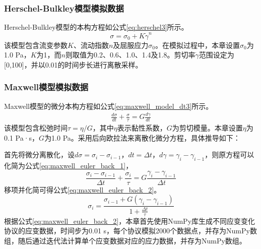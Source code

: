 \subsubsection{Herschel-Bulkley模型模拟数据}
Herschel-Bulkley模型的本构方程如公式\eqref{eq:herschel3}所示。
\begin{equation}
  \sigma=\sigma_0+K\dot{\gamma}^n \label{eq:herschel3}
\end{equation}
该模型包含流变参数$K$、流动指数$n$及屈服应力$\sigma_0$。在模拟过程中，本章设置$\sigma_0$为1.0 Pa，$K$为1，而$n$则取值为0.2、0.6、1.0、1.4及1.8。剪切率$\dot{\gamma}$范围设定为[0,100]，并以0.01的时间步长进行离散采样。

\subsubsection{Maxwell模型模拟数据}
Maxwell模型的微分本构方程如公式\eqref{eq:maxwell_model_dt3}所示。
\begin{gather}
  \frac{d\sigma}{dt} + \frac{\sigma}{\tau}  = G \frac{d\gamma}{dt} \label{eq:maxwell_model_dt3}
\end{gather}
该模型包含松弛时间$\tau=\eta/G$，其中$\eta$表示黏性系数，$G$为剪切模量。本章设置$\eta$为0.1 Pa·s，$G$为1.0 Pa。采用后向欧拉法来离散化微分方程，具体推导如下：

首先将微分离散化，设$d\sigma=\sigma_i - \sigma_{i-1}$，$dt=\Delta t$，$d\gamma=\gamma_i - \gamma_{i-1}$，则原方程可以化简为公式\eqref{eq:maxwell_euler_back_1}，
\begin{equation}
  \frac{\sigma_i - \sigma_{i-1}}{\Delta t} + \frac{\sigma_i}{\tau} = G \frac{\gamma_i - \gamma_{i-1}}{\Delta t} \label{eq:maxwell_euler_back_1}
\end{equation}
移项并化简可得公式\eqref{eq:maxwell_euler_back_2}。
\begin{equation}
  \sigma_i = \frac{\sigma_{i-1} + G (\gamma_i - \gamma_{i-1})}{1 + \frac{\Delta t}{\tau}} \label{eq:maxwell_euler_back_2}
\end{equation}
根据公式\eqref{eq:maxwell_euler_back_2}，本章首先使用NumPy库生成不同应变变化协议的应变数据，时间步为0.01 s，每个协议模拟2000个数据点，并存为NumPy数组，随后通过迭代法计算单个应变数据对应的应力数据，并存为NumPy数组。

